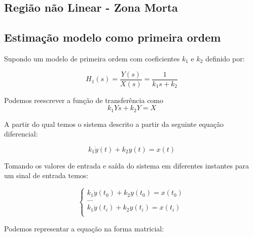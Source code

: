 \documentclass[a4paper,11pt]{article}
\begin{document}
\subsection{Região não Linear - Zona Morta}



\subsection{Estimação modelo como primeira ordem}

Supondo um modelo de primeira ordem com coeficientes $k_1$ e $k_2$ definido por:

\begin{equation}
    H_1(s) = \frac{Y(s)}{X(s)} = \frac{1}{k_1 s+ k_2}
\end{equation}


Podemos reescrever a função de transferência como
\begin{equation}
k_1 Ys + k_2 Y  = X
\end{equation}

A partir do qual temos o sistema descrito a partir da seguinte equação diferencial:

\begin{equation}
k_1 \dot{y}(t) + k_2 y(t) = x(t)
\end{equation}

Tomando os valores de entrada e saída do sistema em diferentes instantes para um sinal de entrada temos:

\begin{equation}
\left\{\begin{array}{c}
    k_1 \dot{y}(t_0) + k_2 y(t_0) = x(t_0)  \\
    \dots\\
    k_1 \dot{y}(t_i) + k_2 y(t_i) = x(t_i)  \\
\end{array} \right.
\end{equation}


Podemos representar a equação na forma matricial:
\end{document}
